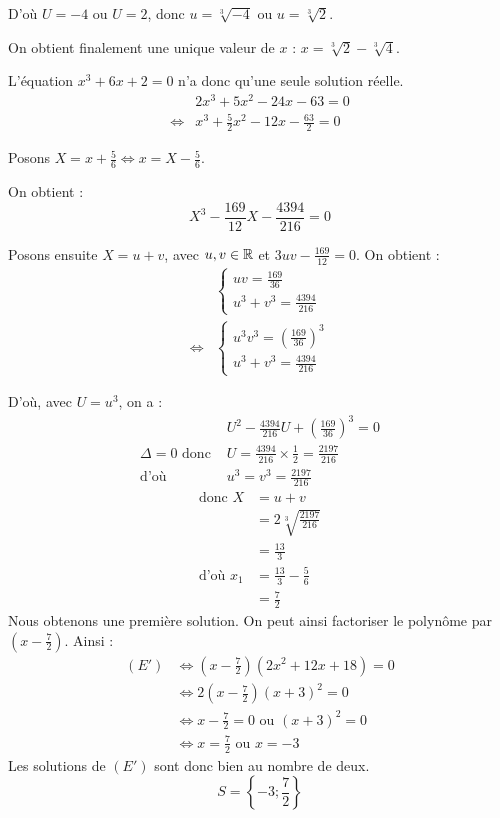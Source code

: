 \documentclass[]{../templates/homework}
\begin{document}
D'où $U=-4$ ou $U=2$, donc $u=\sqrt[3]{-4}$ ou $u=\sqrt[3]{2}$.

On obtient finalement une unique valeur de $x$ : $x=\sqrt[3]{2}-\sqrt[3]{4}$.

L'équation $x^3 + 6x + 2=0$ n'a donc qu'une seule solution réelle. 
\begin{align*}
	& 2x^3 + 5x^2 - 24x - 63 = 0 \\
	\iff & x^3 + \frac{5}{2}x^2 - 12x - \frac{63}{2} = 0
\end{align*}

Posons $X = x + \frac{5}{6} \iff x = X - \frac{5}{6}$.

On obtient : $$X^3 - \frac{169}{12}X - \frac{4394}{216} = 0$$

Posons ensuite $X = u + v$, avec $u, v \in \mathbb R$ et $3uv - \frac{169}{12} = 0$. On obtient :
\begin{align*}
	&\begin{cases}
		uv = \frac{169}{36}\\
		u^3 + v^3 = \frac{4394}{216}
	\end{cases} \\
	\iff 
	&\begin{cases}
		u^3v^3 = (\frac{169}{36})^3\\
		u^3 + v^3 = \frac{4394}{216}
	\end{cases}
\end{align*}

D'où, avec $U = u^3$, on a :
\begin{align*}
	&U^2 - \frac{4394}{216}U + \left( \frac{169}{36} \right)^3 = 0 \\
	\Delta = 0 \text{ donc } &U = \frac{4394}{216} \times \frac{1}{2} = \frac{2197}{216} \\
	\text{d'où } &u^3 = v^3 = \frac{2197}{216}
\end{align*}
\begin{align*}
	\text{donc } X &= u + v \\
	&= 2\sqrt[3]{\frac{2197}{216}} \\
	&= \frac{13}{3} \\
	\text{d'où } x_1 &= \frac{13}{3} - \frac{5}{6} \\
	&= \frac{7}{2}
\end{align*}
Nous obtenons une première solution. On peut ainsi factoriser le polynôme par $(x - \frac{7}{2})$. Ainsi :
\begin{align*}
	(E') & \iff \left( x - \frac{7}{2} \right) (2x^2 + 12x + 18) = 0 \\
	& \iff 2 \left( x - \frac{7}{2} \right) (x+3)^2 = 0 \\
	& \iff x - \frac{7}{2} = 0 \text{ ou } (x+3)^2 = 0 \\
	& \iff x = \frac{7}{2} \text{ ou } x = -3
\end{align*}
Les solutions de $(E')$ sont donc bien au nombre de deux.
$$ S = \left\{ -3 ; \frac{7}{2} \right\} $$
\end{document}
